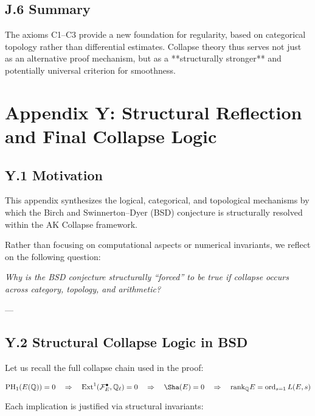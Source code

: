 \subsection*{J.6 Summary}

The axioms C1–C3 provide a new foundation for regularity, based on  
categorical topology rather than differential estimates.  
Collapse theory thus serves not just as an alternative proof mechanism,  
but as a **structurally stronger** and potentially universal criterion for smoothness.



\section*{Appendix Y: Structural Reflection and Final Collapse Logic}

\subsection*{Y.1 Motivation}

This appendix synthesizes the logical, categorical, and topological mechanisms  
by which the Birch and Swinnerton–Dyer (BSD) conjecture is structurally resolved  
within the AK Collapse framework.

Rather than focusing on computational aspects or numerical invariants,  
we reflect on the following question:

\begin{center}
\textit{Why is the BSD conjecture structurally “forced” to be true  
if collapse occurs across category, topology, and arithmetic?}
\end{center}

---

\subsection*{Y.2 Structural Collapse Logic in BSD}

Let us recall the full collapse chain used in the proof:

\[
\mathrm{PH}_1(E(\mathbb{Q})) = 0
\quad \Rightarrow \quad
\mathrm{Ext}^1(\mathcal{F}_E^\bullet, \mathbb{Q}_\ell) = 0
\quad \Rightarrow \quad
\Sha(E) = 0
\quad \Rightarrow \quad
\mathrm{rank}_{\mathbb{Q}} E = \operatorname{ord}_{s=1} L(E, s)
\]

Each implication is justified via structural invariants:

